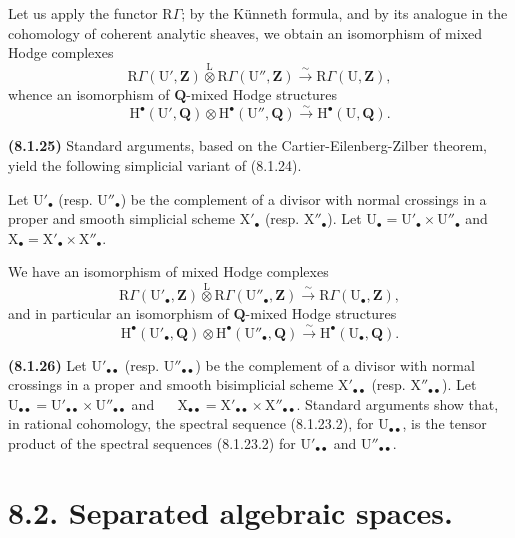 \documentclass[11pt,leqno]{article}
\newcommand{\Page}[1]{\ifvmode\noindent\else\unskip\ \fi{\footnotesize\textcolor{gray}{[p.\,#1]}}\ \ignorespaces}
\begin{document}
Let us apply the functor \(\mathrm{R}\Gamma\); by the Künneth formula, and by its analogue in the cohomology of coherent analytic sheaves, we obtain an isomorphism of mixed Hodge complexes
\[
\mathrm{R}\Gamma(\mathrm{U}',\mathbf{Z})
\overset{\mathrm{L}}{\otimes}
\mathrm{R}\Gamma(\mathrm{U}'',\mathbf{Z})
\xrightarrow{\sim}
\mathrm{R}\Gamma(\mathrm{U},\mathbf{Z}),
\]
whence an isomorphism of \(\mathbf{Q}\)-mixed Hodge structures
\[
\mathrm{H}^\bullet(\mathrm{U}',\mathbf{Q})
\otimes\mathrm{H}^\bullet(\mathrm{U}'',\mathbf{Q})
\xrightarrow{\sim}\mathrm{H}^\bullet(\mathrm{U},\mathbf{Q}).
\]

\textbf{(8.1.25)} Standard arguments, based on the Cartier-Eilenberg-Zilber theorem, yield the following simplicial variant of (8.1.24).

Let \(\mathrm{U}'_\bullet\) (resp. \(\mathrm{U}''_\bullet\)) be the complement of a divisor with normal crossings in a proper and smooth simplicial scheme \(\mathrm{X}'_\bullet\) (resp. \(\mathrm{X}''_\bullet\)). Let \(\mathrm{U}_\bullet=\mathrm{U}'_\bullet\times\mathrm{U}''_\bullet\) and \(\mathrm{X}_\bullet=\mathrm{X}'_\bullet\times\mathrm{X}''_\bullet\).

We have an isomorphism of mixed Hodge complexes
\[
\mathrm{R}\Gamma(\mathrm{U}'_\bullet,\mathbf{Z})
\overset{\mathrm{L}}{\otimes}
\mathrm{R}\Gamma(\mathrm{U}''_\bullet,\mathbf{Z})
\xrightarrow{\sim}
\mathrm{R}\Gamma(\mathrm{U}_\bullet,\mathbf{Z}),
\]
and in particular an isomorphism of \(\mathbf{Q}\)-mixed Hodge structures
\[
\mathrm{H}^\bullet(\mathrm{U}'_\bullet,\mathbf{Q})
\otimes\mathrm{H}^\bullet(\mathrm{U}''_\bullet,\mathbf{Q})
\xrightarrow{\sim}\mathrm{H}^\bullet(\mathrm{U}_\bullet,\mathbf{Q}).
\]

\textbf{(8.1.26)} Let \(\mathrm{U}'_{\bullet\bullet}\) (resp. \(\mathrm{U}''_{\bullet\bullet}\)) be the complement of a divisor with normal crossings in a proper and smooth bisimplicial scheme \(\mathrm{X}'_{\bullet\bullet}\) (resp. \(\mathrm{X}''_{\bullet\bullet}\)). Let \(\mathrm{U}_{\bullet\bullet}=\mathrm{U}'_{\bullet\bullet}\times\mathrm{U}''_{\bullet\bullet}\) and
\Page{38}
\(\mathrm{X}_{\bullet\bullet}=\mathrm{X}'_{\bullet\bullet}\times\mathrm{X}''_{\bullet\bullet}\). Standard arguments show that, in rational cohomology, the spectral sequence (8.1.23.2), for \(\mathrm{U}_{\bullet\bullet}\), is the tensor product of the spectral sequences (8.1.23.2) for \(\mathrm{U}'_{\bullet\bullet}\) and \(\mathrm{U}''_{\bullet\bullet}\).

\section*{8.2. Separated algebraic spaces.}
\end{document}
